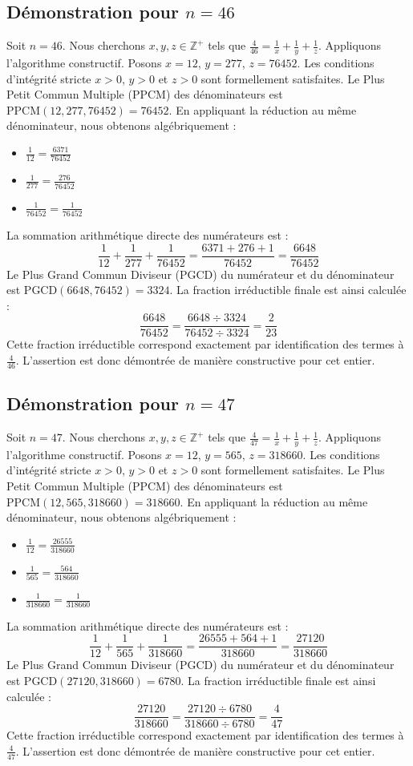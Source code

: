 \documentclass[11pt,a4paper]{article}
\begin{document}
\subsection{Démonstration pour $n = 46$}
Soit $n = 46$. Nous cherchons $x, y, z \in \mathbb{Z}^{+}$ tels que $\frac{4}{46} = \frac{1}{x} + \frac{1}{y} + \frac{1}{z}$.
Appliquons l'algorithme constructif. Posons $x = 12$, $y = 277$, $z = 76452$.
Les conditions d'intégrité stricte $x > 0$, $y > 0$ et $z > 0$ sont formellement satisfaites.
Le Plus Petit Commun Multiple (PPCM) des dénominateurs est $\text{PPCM}(12, 277, 76452) = 76452$.
En appliquant la réduction au même dénominateur, nous obtenons algébriquement :
\begin{itemize}
    \item $\frac{1}{12} = \frac{6371}{76452}$
    \item $\frac{1}{277} = \frac{276}{76452}$
    \item $\frac{1}{76452} = \frac{1}{76452}$
\end{itemize}
La sommation arithmétique directe des numérateurs est :
$$ \frac{1}{12} + \frac{1}{277} + \frac{1}{76452} = \frac{6371 + 276 + 1}{76452} = \frac{6648}{76452} $$
Le Plus Grand Commun Diviseur (PGCD) du numérateur et du dénominateur est $\text{PGCD}(6648, 76452) = 3324$.
La fraction irréductible finale est ainsi calculée :
$$ \frac{6648}{76452} = \frac{6648 \div 3324}{76452 \div 3324} = \frac{2}{23} $$
Cette fraction irréductible correspond exactement par identification des termes à $\frac{4}{46}$. L'assertion est donc démontrée de manière constructive pour cet entier.

\subsection{Démonstration pour $n = 47$}
Soit $n = 47$. Nous cherchons $x, y, z \in \mathbb{Z}^{+}$ tels que $\frac{4}{47} = \frac{1}{x} + \frac{1}{y} + \frac{1}{z}$.
Appliquons l'algorithme constructif. Posons $x = 12$, $y = 565$, $z = 318660$.
Les conditions d'intégrité stricte $x > 0$, $y > 0$ et $z > 0$ sont formellement satisfaites.
Le Plus Petit Commun Multiple (PPCM) des dénominateurs est $\text{PPCM}(12, 565, 318660) = 318660$.
En appliquant la réduction au même dénominateur, nous obtenons algébriquement :
\begin{itemize}
    \item $\frac{1}{12} = \frac{26555}{318660}$
    \item $\frac{1}{565} = \frac{564}{318660}$
    \item $\frac{1}{318660} = \frac{1}{318660}$
\end{itemize}
La sommation arithmétique directe des numérateurs est :
$$ \frac{1}{12} + \frac{1}{565} + \frac{1}{318660} = \frac{26555 + 564 + 1}{318660} = \frac{27120}{318660} $$
Le Plus Grand Commun Diviseur (PGCD) du numérateur et du dénominateur est $\text{PGCD}(27120, 318660) = 6780$.
La fraction irréductible finale est ainsi calculée :
$$ \frac{27120}{318660} = \frac{27120 \div 6780}{318660 \div 6780} = \frac{4}{47} $$
Cette fraction irréductible correspond exactement par identification des termes à $\frac{4}{47}$. L'assertion est donc démontrée de manière constructive pour cet entier.
\end{document}
